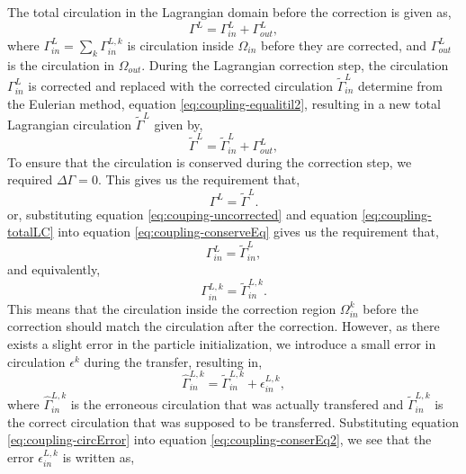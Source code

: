 	The total circulation in the Lagrangian domain before the correction is given as,
		\begin{equation}
		\Gamma^L = \Gamma_{in}^L + \Gamma_{out}^L,
		\label{eq:couping-uncorrected}
		\end{equation}
	where $\Gamma_{in}^L = \sum_k \Gamma_{in}^{L,k}$ is circulation inside $\Omega_{in}$ before they are corrected, and $\Gamma_{out}^L$ is the circulation in $\Omega_{out}$. During the Lagrangian correction step, the circulation $\Gamma_{in}^L$ is corrected and replaced with the corrected circulation $\tilde{\Gamma}_{in}^L$ determine from the Eulerian method, equation \ref{eq:coupling-equalitil2}, resulting in a new total Lagrangian circulation $\tilde{\Gamma}^{L}$ given by,
		\begin{equation}
		\tilde{\Gamma}^{L} = \tilde{\Gamma}_{in}^L + \Gamma_{out}^L,
		\label{eq:coupling-totalLC}
		\end{equation}
	To ensure that the circulation is conserved during the correction step, we required $\Delta \Gamma=0$. This gives us the requirement that,
		\begin{equation}
		\Gamma^{L} = \tilde{\Gamma}^{L}.
		\label{eq:coupling-conserveEq}
		\end{equation}
	or, substituting equation \ref{eq:couping-uncorrected} and equation \ref{eq:coupling-totalLC} into equation \ref{eq:coupling-conserveEq} gives us the requirement that,
		\begin{equation}
		\Gamma_{in}^L = \tilde{\Gamma}_{in}^L, 
		\label{eq:coupling-conserEq2}
		\end{equation}
	and equivalently,
			\begin{equation}
			\Gamma_{in}^{L,k} = \tilde{\Gamma}_{in}^{L,k}.
			\label{eq:coupling-conserEq3}
			\end{equation}		
	This means that the circulation inside the correction region $\Omega_{in}^k$ before the correction should match the circulation after the correction. However, as there exists a slight error in the particle initialization, we introduce a small error in circulation $\epsilon^k$ during the transfer, resulting in,
		\begin{equation}
		\hat{\Gamma}_{in}^{L,k} = \tilde{\Gamma}_{in}^{L,k} + \epsilon_{in}^{L,k},
		\label{eq:coupling-circError}
		\end{equation}
	where $\hat{\Gamma}_{in}^{L,k}$ is the erroneous circulation that was actually transfered and $\tilde{\Gamma}_{in}^{L,k}$ is the correct circulation that was supposed to be transferred. Substituting equation \ref{eq:coupling-circError} into equation \ref{eq:coupling-conserEq2}, we see that the error $\epsilon_{in}^{L,k}$ is written as,
